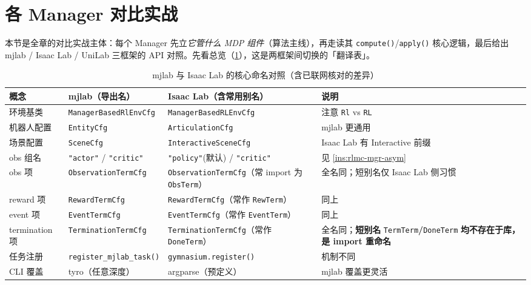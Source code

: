 \section{各 Manager 对比实战}
\label{sec:rlmc-mgr-managers}

本节是全章的对比实战主体：每个 Manager 先立\emph{它管什么 MDP 组件}（算法主线），再走读其 \verb|compute()|/\verb|apply()| 核心逻辑，最后给出 mjlab / Isaac Lab / UniLab 三框架的 API 对照。先看总览（\cref{tab:rlmc-mgr-naming}），这是两框架间切换的「翻译表」。

\begin{table}[ht]
\centering
\caption{mjlab 与 Isaac Lab 的核心命名对照（含已联网核对的差异）}
\label{tab:rlmc-mgr-naming}
\small
\begin{tabular}{@{}llll@{}}
\toprule
概念 & mjlab（导出名） & Isaac Lab（含常用别名） & 说明 \\
\midrule
环境基类 & \verb|ManagerBasedRlEnvCfg| & \verb|ManagerBasedRLEnvCfg| & 注意 \verb|Rl| vs \verb|RL| \\
机器人配置 & \verb|EntityCfg| & \verb|ArticulationCfg| & mjlab 更通用 \\
场景配置 & \verb|SceneCfg| & \verb|InteractiveSceneCfg| & Isaac Lab 有 Interactive 前缀 \\
obs 组名 & \verb|"actor"| / \verb|"critic"| & \verb|"policy"|(默认) / \verb|"critic"| & 见 \cref{ins:rlmc-mgr-asym} \\
obs 项 & \verb|ObservationTermCfg| & \verb|ObservationTermCfg|（常 import 为 \verb|ObsTerm|） & 全名同；短别名仅 Isaac Lab 侧习惯 \\
reward 项 & \verb|RewardTermCfg| & \verb|RewardTermCfg|（常作 \verb|RewTerm|） & 同上 \\
event 项 & \verb|EventTermCfg| & \verb|EventTermCfg|（常作 \verb|EventTerm|） & 同上 \\
termination 项 & \verb|TerminationTermCfg| & \verb|TerminationTermCfg|（常作 \verb|DoneTerm|） & 全名同；\textbf{短别名} \verb|TermTerm|\textbf{/}\verb|DoneTerm| \textbf{均不存在于库，是 import 重命名} \\
任务注册 & \verb|register_mjlab_task()| & \verb|gymnasium.register()| & 机制不同 \\
CLI 覆盖 & tyro（任意深度） & argparse（预定义） & mjlab 覆盖更灵活 \\
\bottomrule
\end{tabular}
\end{table}

